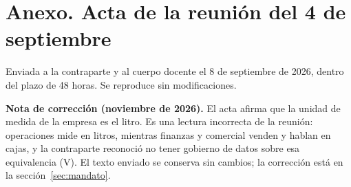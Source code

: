 
\section*{Anexo. Acta de la reunión del 4 de septiembre}

\noindent Enviada a la contraparte y al cuerpo docente el 8 de septiembre de 2026, dentro del plazo de 48 horas. Se reproduce sin modificaciones.

\medskip
\noindent\textbf{Nota de corrección (noviembre de 2026).} El acta afirma que la unidad de medida de la empresa es el litro. Es una lectura incorrecta de la reunión: operaciones mide en litros, mientras finanzas y comercial venden y hablan en cajas, y la contraparte reconoció no tener gobierno de datos sobre esa equivalencia (V). El texto enviado se conserva sin cambios; la corrección está en la sección~\ref{sec:mandato}.


